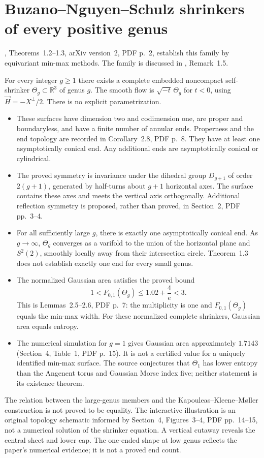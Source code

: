 \chapter{Buzano--Nguyen--Schulz shrinkers of every positive genus}\label{sec:catalogue-bns-genus}
\cite{CatBNS2025}, Theorems~1.2--1.3, arXiv version~2, PDF p.~2,
establish this family by equivariant min-max methods. The family is
discussed in \cite{CatChuSun2025}, Remark~1.5.

\begin{example}\label{ex:catalogue-bns-genus}
For every integer $g\geq1$ there exists a complete embedded noncompact
self-shrinker $\Theta_g\subset\mathbb R^3$ of genus $g$.
The smooth flow is $\sqrt{-t}\,\Theta_g$ for $t<0$, using
$\vec H=-X^\perp/2$. There is no explicit parametrization.
\begin{itemize}
\item These surfaces have dimension two and codimension one, are proper
and boundaryless, and have a finite number of annular ends. Properness
and the end topology are recorded in Corollary~2.8, PDF p.~8.
They have at least one asymptotically conical end. Any additional ends
are asymptotically conical or cylindrical.
\item The proved symmetry is invariance under the dihedral group
$D_{g+1}$ of order $2(g+1)$, generated by half-turns about $g+1$
horizontal axes. The surface contains these axes and meets the vertical
axis orthogonally. Additional reflection symmetry is proposed, rather
than proved, in Section~2, PDF pp.~3--4.
\item For all sufficiently large $g$, there is exactly one asymptotically
conical end. As $g\to\infty$, $\Theta_g$ converges as a varifold to
the union of the horizontal plane and $S^2(2)$, smoothly locally away
from their intersection circle. Theorem~1.3 does not establish exactly
one end for every small genus.
\item The normalized Gaussian area satisfies the proved bound
\[
 1<F_{0,1}(\Theta_g)\leq 1.02+\frac4e<3.
\]
This is Lemmas~2.5--2.6, PDF p.~7: the multiplicity is one and
$F_{0,1}(\Theta_g)$ equals the min-max width. For these normalized
complete shrinkers, Gaussian area equals entropy.
\item The numerical simulation for $g=1$ gives Gaussian area approximately
$1.7143$ (Section~4, Table~1, PDF p.~15). It is not a certified value
for a uniquely identified min-max surface. The source conjectures that
$\Theta_1$ has lower entropy than the Angenent torus and Gaussian Morse
index five; neither statement is its existence theorem.
\end{itemize}
The relation between the large-genus members and the
Kapouleas--Kleene--M{\o}ller construction is not proved to be equality.
The interactive illustration is an original topology schematic informed by
Section~4, Figures~3--4, PDF pp.~14--15, not a numerical solution of the
shrinker equation. A vertical cutaway reveals the central sheet and lower
cap. The one-ended shape at low genus reflects the paper's numerical
evidence; it is not a proved end count.
\end{example}

